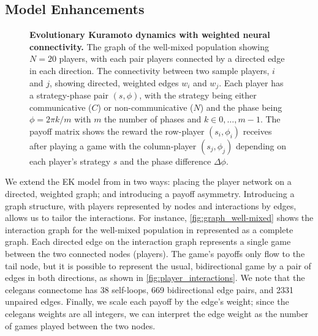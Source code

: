 \documentclass[pdflatex,twocolumn,sn-nature,super]{sn-jnl}
\begin{document}
\subsection{Model Enhancements}
\begin{figure*}
  \centering
  \begin{nomemoize} %
    \begin{subcaptiongroup}
        {\label{fig:payoff_matrix}\captiontext*{}}{%
        {\label{fig:player_interactions}\captiontext*{}}{%
        {\label{fig:graph_well-mixed}\captiontext*{}}{%
      {}%
    }}}
    \end{subcaptiongroup}
  \end{nomemoize}
  \caption{
    \textbf{
      Evolutionary Kuramoto dynamics with weighted neural connectivity.
    }
    The graph of the well-mixed population showing $N=20$ players,
    with each pair players connected by a directed edge in each direction.
    The connectivity between two sample players, $i$ and $j$,
    showing directed, weighted edges $w_i$ and $w_j$.
    Each player has a strategy-phase pair $(s, \phi)$,
    with the strategy being either communicative ($C$) or non-communicative ($N$)
    and the phase being $\phi = 2\pi k/m$ with $m$ the number of phases
    and $k \in 0,\ldots,m-1$.
    The payoff matrix shows the reward the row-player $(s_i, \phi_i)$
    receives after playing a game with the column-player $(s_j, \phi_j)$
    depending on each player's strategy $s$ and the phase difference $\Delta \phi$.
  }\label{fig:connectivity}
\end{figure*}

We extend the EK model from \tripp{} in two ways:
placing the player network on a directed, weighted graph;
and introducing a payoff asymmetry.
Introducing a graph structure, with players represented by nodes
and interactions by edges, allows us to tailor the interactions.
For instance, \cref{fig:graph_well-mixed} shows the interaction graph
for the well-mixed population in \tripp{} represented as a complete graph.
Each directed edge on the interaction graph
represents a single game between the two connected nodes (players).
The game's payoffs only flow to the tail node,
but it is possible to represent
the usual, bidirectional game by
a pair of edges in both directions,
as shown in \cref{fig:player_interactions}.
We note that the \gls{celegans} connectome
has \num{38} self-loops, \num{669} bidirectional edge pairs,
and \num{2331} unpaired edges.
Finally, we scale each payoff by the edge's weight;
since the \gls{celegans} weights are all integers,
we can interpret the edge weight as the number of games played
between the two nodes.
\end{document}
